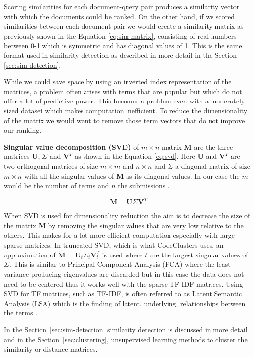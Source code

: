 Scoring similarities for each document-query pair produces a similarity vector with which the documents could be ranked. On the other hand, if we scored similarities between each document pair we would create a similarity matrix as previously shown in the Equation \ref{eq:sim-matrix}, consisting of real numbers between 0-1 which is symmetric and has diagonal values of 1. This is the same format used in similarity detection as described in more detail in the Section \ref{sec:sim-detection}.

While we could save space by using an inverted index representation of the matrices, a problem often arises with terms that are popular but which do not offer a lot of predictive power. This becomes a problem even with a moderately sized dataset which makes computation inefficient. To reduce the dimensionality of the matrix we would want to remove those term vectors that do not improve our ranking.

\textbf{Singular value decomposition (SVD)} of $m \times n$ matrix \textbf{M} are the three matrices $\textbf{U}$, $\Sigma$ and $\textbf{V}^{T}$ as shown in the Equation \ref{eq:svd}. Here \textbf{U} and $\textbf{V}^{T}$ are two orthogonal matrices of size $m \times m$ and $n \times n$ and $\Sigma$ a diagonal matrix of size $m \times n$ with all the singular values of \textbf{M} as its diagonal values. In our case the $m$ would be the number of terms and $n$ the submissions \cite{intro-to-ir, mmds-2014-ullman}.

\vspace{-6pt}
\begin{equation}
\label{eq:svd}
\textbf{M}=\textbf{U}\Sigma\textbf{V}^{T}
\end{equation}
\vspace{-10pt}

When SVD is used for dimensionality reduction the aim is to decrease the size of the matrix \textbf{M} by removing the singular values that are very low relative to the others. This makes for a lot more efficient computation especially with large sparse matrices. In truncated SVD, which is what CodeClusters uses, an approximation of $\widetilde{\textbf{M}}=\textbf{U}_t\Sigma_t\textbf{V}^{T}_t$ is used where $t$ are the largest singular values of $\Sigma$. This is similar to Principal Component Analysis (PCA) where the least variance producing eigenvalues are discarded but in this case the data does not need to be centered thus it works well with the sparse TF-IDF matrices. Using SVD for TF matrices, such as TF-IDF, is often referred to as Latent Semantic Analysis (LSA) which is the finding of latent, underlying, relationships between the terms \cite{intro-to-ir, mmds-2014-ullman}.

In the Section~\ref{sec:sim-detection} similarity detection is discussed in more detail and in the Section~\ref{sec:clustering}, unsupervised learning methods to cluster the similarity or distance matrices.

